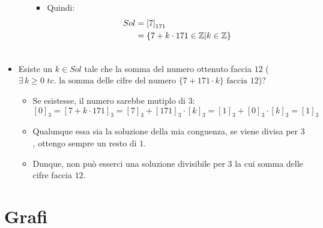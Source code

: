 \documentclass[10pt]{article}
\begin{document}
\begin{itemize}
\begin{enumerate}
\begin{itemize}
		\item
		Quindi:
		\begin{equation}
		\begin{split}
		Sol &= \left[7\right]_{171} \\
		&= \{7 + k \cdot 171 \in \mathbb{Z} | k \in \mathbb{Z} \}  \\
		\notag
		\end{split}
		\end{equation}
		\end{itemize}
		\end{enumerate}
		\item
		Esiste un $k \in Sol$ tale che la somma del numero ottenuto faccia $12$ ($\exists \, k \geq 0 \,\, tc. \textrm{ la somma delle cifre del numero } \{7 + 171 \cdot k\} \textrm{ faccia } 12 $)?
		\begin{itemize}
		\item
		Se esistesse, il numero sarebbe mutiplo di $3$:
		$$\left[0\right]_3 = \left[7 + k \cdot 171\right]_3 = \left[7\right]_3 + \left[171\right]_3 \cdot \left[k\right]_3 = \left[1\right]_3 + \left[0\right]_3 \cdot \left[k\right]_3 = \left[1\right]_3$$
		\item
		Qualunque essa sia la soluzione della mia conguenza, se viene divisa per $3$, ottengo sempre un resto di $1$.
		\item
		Dunque, non può esserci una soluzione divisibile per 3 la cui somma delle cifre faccia $12$.
		\end{itemize}
		
		\end{itemize}
	
	\newpage
	\section{Grafi}
\end{document}
